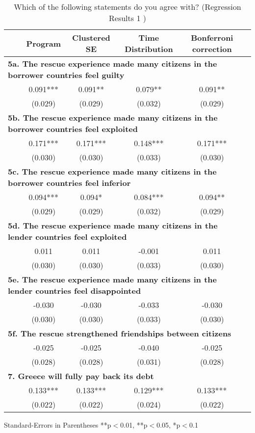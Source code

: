 \begin{table}[h!]
\caption{Which of the following statements do you agree with? (Regression Results 1 )} 
\hskip -2.5cm 
\begin{tabular}{l*{5}{c}}
\hline\hline
\ \  &Program & Clustered SE & Time Distribution & Bonferroni correction \\
\hline
\multicolumn{5}{l}{\textbf{ 5a. The rescue experience made many citizens in the borrower countries feel guilty}} \\
\ \   &0.091{***}&0.091{**}&0.079{**} &0.091{**}\\ 
&(0.029) & (0.029) & (0.032) & (0.029)   \\ 
\multicolumn{5}{l}{\textbf{ 5b. The rescue experience made many citizens in the borrower countries feel exploited}} \\
\ \  &0.171{***}&0.171{***}&0.148{***}&0.171{***} \\ 
&(0.030) & (0.030) & (0.033) & (0.030)  \\
\multicolumn{5}{l}{\textbf{ 5c. The rescue experience made many citizens in the borrower countries feel inferior }} \\
\ \  &0.094{***}&0.094{*}&0.084{***}&0.094{**} \\ 
&(0.029) & (0.029) & (0.032) & (0.029)  \\
\multicolumn{5}{l}{\textbf{ 5d. The rescue experience made many citizens in the lender countries feel exploited}} \\
\ \   &0.011{}&0.011{}&-0.001{} &0.011{}\\ 
&(0.030) & (0.030) & (0.033) & (0.030)   \\ 
\multicolumn{5}{l}{\textbf{ 5e. The rescue experience made many citizens in the lender countries feel disappointed}} \\
\ \  &-0.030{}&-0.030{}&-0.033{}&-0.030{}\\ 
&(0.030) & (0.030) & (0.033) & (0.030)  \\
\multicolumn{5}{l}{\textbf{ 5f. The rescue strengthened friendships between citizens}} \\
\ \  &-0.025{}&-0.025{}&-0.040{}&-0.025{}\\ 
&(0.028) & (0.028) & (0.031) & (0.028) \\
\hline
\multicolumn{5}{l}{\textbf{7. Greece will fully pay back its debt}} \\
\ \   &0.133{***}&0.133{***}&0.129{***} &0.133{***}\\ 
&(0.022) & (0.022) & (0.024) & (0.022)   \\ 
\hline\hline
\end{tabular}
\begin{tablenotes}
\small
\item Standard-Errors in Parentheses \quad ***p$<$0.01, **p$<$0.05, *p$<$0.1  
\end{tablenotes}
\end{table}
